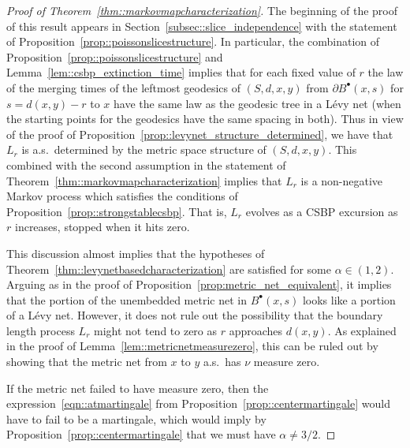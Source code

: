 \documentclass[10pt]{amsart}
\newcommand{\sbullet}{{\scriptscriptstyle\bullet}}
\theoremstyle{plain}
\numberwithin{theorem}{section}
\theoremstyle{definition}
\newcommand{\fb}[2]{B^\sbullet(#1,#2)}
\begin{document}
\begin{proof}[Proof of Theorem~\ref{thm::markovmapcharacterization}]
The beginning of the proof of this result appears in Section~\ref{subsec::slice_independence} with the statement of Proposition~\ref{prop::poissonslicestructure}. In particular, the combination of Proposition~\ref{prop::poissonslicestructure} and Lemma~\ref{lem::csbp_extinction_time} implies that for each fixed value of $r$ the law of the merging times of the leftmost geodesics of $(S,d,x,y)$ from $\partial \fb{x}{s}$ for $s=d(x,y)-r$ to $x$ have the same law as the geodesic tree in a Lévy net (when the starting points for the geodesics have the same spacing in both). Thus in view of the proof of Proposition~\ref{prop::levynet_structure_determined}, we have that $L_r$ is a.s.\ determined by the metric space structure of $(S,d,x,y)$. This combined with the second assumption in the statement of Theorem~\ref{thm::markovmapcharacterization} implies that $L_r$ is a non-negative Markov process which satisfies the conditions of Proposition~\ref{prop::strongstablecsbp}. That is, $L_r$ evolves as a CSBP excursion as $r$ increases, stopped when it hits zero.

This discussion almost implies that the hypotheses of Theorem~\ref{thm::levynetbasedcharacterization} are satisfied for some $\alpha \in (1,2)$. Arguing as in the proof of Proposition~\ref{prop:metric_net_equivalent}, it implies that the portion of the unembedded metric net in $\fb{x}{s}$ looks like a portion of a Lévy net. However, it does not rule out the possibility that the boundary length process $L_r$ might not tend to zero as $r$ approaches $d(x,y)$. As explained in the proof of Lemma~\ref{lem::metricnetmeasurezero}, this can be ruled out by showing that the metric net from $x$ to $y$ a.s.\ has $\nu$ measure zero.

If the metric net failed to have measure zero, then the expression~\eqref{eqn::atmartingale} from Proposition~\ref{prop::centermartingale} would have to fail to be a martingale, which would imply by Proposition~\ref{prop::centermartingale} that we must have $\alpha \not = 3/2$.


\end{proof}
\end{document}
